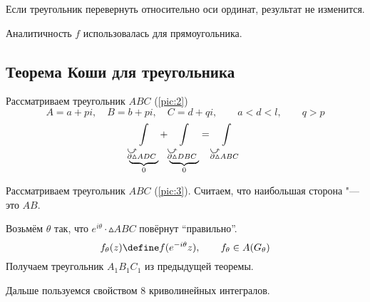 Если треугольник перевернуть относительно оси ординат, результат не изменится.

\begin{remark}
	Аналитичность $ f $ использовалась для прямоугольника.
\end{remark}

\subsection{Теорема Коши для треугольника}

\begin{figure}[!h]
	\centering
	\caption{}
	\label{pic:2}
\end{figure}

\begin{theorem}
	Рассматриваем треугольник $ ABC $ (\autoref{pic:2})
	$$ A = a + pi, \quad B = b + pi, \quad C = d + qi, \qquad a < d < l, \qquad q > p $$
	$$ \underbrace{\int\limits_{\curvedir{\partial \vartriangle}ADC}}_0 + \underbrace{\int\limits_{\curvedir{\partial\vartriangle}DBC}}_0 = \int\limits_{\curvedir{\partial\vartriangle}ABC} $$
\end{theorem}

\begin{figure}[!ht]
	\centering
	\caption{}
	\label{pic:3}
\end{figure}

\begin{theorem}
	Рассматриваем треугольник $ ABC $ (\autoref{pic:3}). Считаем, что наибольшая сторона "--- это $ AB $.

	Возьмём $ \theta $ так, что $ e^{i\theta} \cdot \vartriangle ABC $ повёрнут ``правильно''.
	$$ f_\theta(z) \define f(e^{-i\theta}z), \qquad f_\theta \in A(G_\theta) $$
	Получаем треугольник $ A_1B_1C_1 $ из предыдущей теоремы.

	Дальше пользуемся свойством 8 криволинейных интегралов.
\end{theorem}

